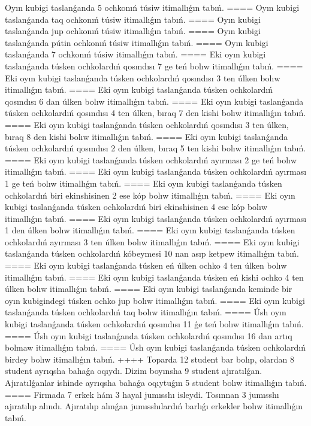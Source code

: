 Oyın kubigi taslanǵanda 5 ochkonıń túsiw itimallıǵın tabıń.
====
Oyın kubigi taslanǵanda taq ochkonıń túsiw itimallıǵın tabıń.
====
Oyın kubigi taslanǵanda jup ochkonıń túsiw itimallıǵın tabıń.
====
Oyın kubigi taslanǵanda pútin ochkonıń túsiw itimallıǵın tabıń.
====
Oyın kubigi taslanǵanda 7 ochkonıń túsiw itimallıǵın tabıń.
====
Eki oyın kubigi taslanǵanda túsken ochkolardıń qosındısı 7 ge teń bolıw itimallıǵın tabıń.
====
Eki oyın kubigi taslanǵanda túsken ochkolardıń qosındısı 3 ten úlken bolıw itimallıǵın tabıń.
====
Eki oyın kubigi taslanǵanda túsken ochkolardıń qosındısı 6 dan úlken bolıw itimallıǵın tabıń.
====
Eki oyın kubigi taslanǵanda túsken ochkolardıń qosındısı 4 ten úlken, bıraq 7 den kishi bolıw itimallıǵın tabıń.
====
Eki oyın kubigi taslanǵanda túsken ochkolardıń qosındısı 3 ten úlken, bıraq 8 den kishi bolıw itimallıǵın tabıń.
====
Eki oyın kubigi taslanǵanda túsken ochkolardıń qosındısı 2 den úlken, bıraq 5 ten kishi bolıw itimallıǵın tabıń.
====
Eki oyın kubigi taslanǵanda túsken ochkolardıń ayırması 2 ge teń bolıw itimallıǵın tabıń.
====
Eki oyın kubigi taslanǵanda túsken ochkolardıń ayırması 1 ge teń bolıw itimallıǵın tabıń.
====
Eki oyın kubigi taslanǵanda túsken ochkolardıń biri ekinshisinen 2 ese kóp bolıw itimallıǵın tabıń.
====
Eki oyın kubigi taslanǵanda túsken ochkolardıń biri ekinshisinen 4 ese kóp bolıw itimallıǵın tabıń.
====
Eki oyın kubigi taslanǵanda túsken ochkolardıń ayırması 1 den úlken bolıw itimallıǵın tabıń.
====
Eki oyın kubigi taslanǵanda túsken ochkolardıń ayırması 3 ten úlken bolıw itimallıǵın tabıń.
====
Eki oyın kubigi taslanǵanda túsken ochkolardıń kóbeymesi 10 nan asıp ketpew itimallıǵın tabıń.
====
Eki oyın kubigi taslanǵanda túsken eń úlken ochko 4 ten úlken bolıw itimallıǵın tabıń.
====
Eki oyın kubigi taslanǵanda túsken eń kishi ochko 4 ten úlken bolıw itimallıǵın tabıń.
====
Eki oyın kubigi taslanǵanda keminde bir oyın kubigindegi túsken ochko jup bolıw itimallıǵın tabıń.
====
Eki oyın kubigi taslanǵanda túsken ochkolardıń taq bolıw itimallıǵın tabıń.
====
Úsh oyın kubigi taslanǵanda túsken ochkolardıń qosındısı 11 ǵe teń bolıw itimallıǵın tabıń.
====
Úsh oyın kubigi taslanǵanda túsken ochkolardıń qosındısı 16 dan artıq bolmaw itimallıǵın tabıń.
====
Úsh oyın kubigi taslanǵanda túsken ochkolardıń birdey bolıw itimallıǵın tabıń.
++++
Toparda 12 student bar bolıp, olardan 8 student ayrıqsha bahaǵa oqıydı. Dizim boyınsha 9 student ajıratılǵan. Ajıratılǵanlar ishinde ayrıqsha bahaǵa oqıytuǵın 5 student bolıw itimallıǵın tabıń.
====
Firmada 7 erkek hám 3 hayal jumısshı isleydi. Tosınnan 3 jumısshı ajıratılıp alındı. Ajıratılıp alınǵan jumısshılardıń barlıǵı erkekler bolıw itimallıǵın tabıń.
